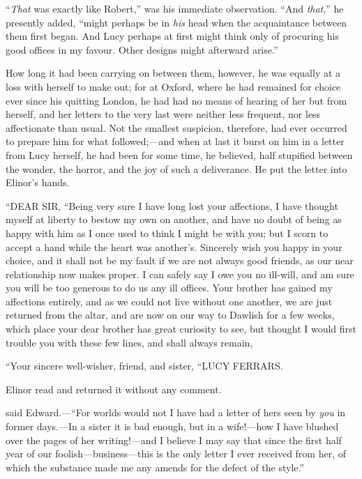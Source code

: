 “{\em That} was exactly like Robert,” was his immediate observation. “And {\em that},” he presently added, “might perhaps be in {\em his} head when the acquaintance between them first began. And Lucy perhaps at first might think only of procuring his good offices in my favour. Other designs might afterward arise.”

How long it had been carrying on between them, however, he was equally at a loss with herself to make out; for at Oxford, where he had remained for choice ever since his quitting London, he had had no means of hearing of her but from herself, and her letters to the very last were neither less frequent, nor less affectionate than usual. Not the smallest suspicion, therefore, had ever occurred to prepare him for what followed;---and when at last it burst on him in a letter from Lucy herself, he had been for some time, he believed, half stupified between the wonder, the horror, and the joy of such a deliverance. He put the letter into Elinor's hands.

“DEAR SIR,\crlf
“Being very sure I have long lost your affections, I have thought myself at liberty to bestow my own on another, and have no doubt of being as happy with him as I once used to think I might be with you; but I scorn to accept a hand while the heart was another's. Sincerely wish you happy in your choice, and it shall not be my fault if we are not always good friends, as our near relationship now makes proper. I can safely say I owe you no ill-will, and am sure you will be too generous to do us any ill offices. Your brother has gained my affections entirely, and as we could not live without one another, we are just returned from the altar, and are now on our way to Dawlish for a few weeks, which place your dear brother has great curiosity to see, but thought I would first trouble you with these few lines, and shall always remain,

“Your sincere well-wisher, friend, and sister,\crlf
“LUCY FERRARS.


Elinor read and returned it without any comment.

 said Edward.---“For worlds would not I have had a letter of hers seen by {\em you} in former days.---In a sister it is bad enough, but in a wife!---how I have blushed over the pages of her writing!---and I believe I may say that since the first half year of our foolish---business---this is the only letter I ever received from her, of which the substance made me any amends for the defect of the style.”

